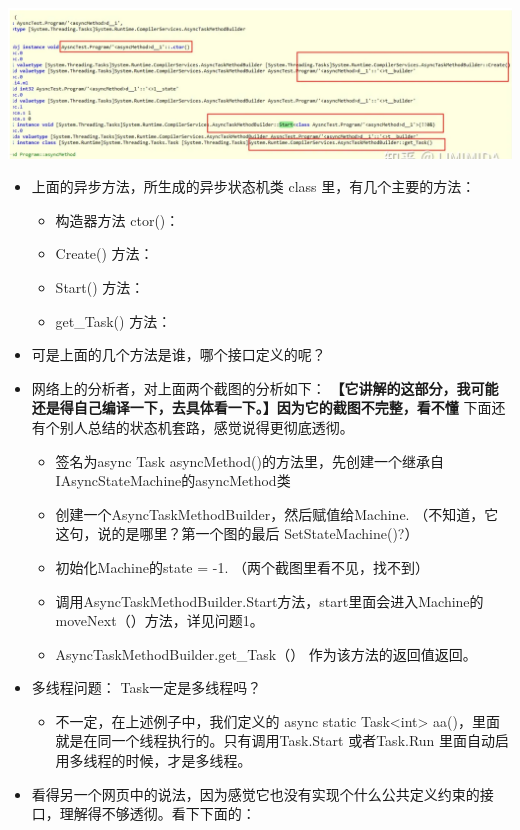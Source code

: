 \documentclass[9pt, b5paper]{article}
\begin{document}
\includegraphics[width=.9\linewidth]{./pic/et3_20230609_112757.png}
\begin{itemize}
\item 上面的异步方法，所生成的异步状态机类 class 里，有几个主要的方法：
\begin{itemize}
\item 构造器方法 ctor()：
\item Create() 方法：
\item Start() 方法：
\item get\_Task() 方法：
\end{itemize}
\item 可是上面的几个方法是谁，哪个接口定义的呢？
\item 网络上的分析者，对上面两个截图的分析如下： \textbf{【它讲解的这部分，我可能还是得自己编译一下，去具体看一下。】因为它的截图不完整，看不懂} 下面还有个别人总结的状态机套路，感觉说得更彻底透彻。
\begin{itemize}
\item 签名为async Task asyncMethod()的方法里，先创建一个继承自IAsyncStateMachine的asyncMethod类
\item 创建一个AsyncTaskMethodBuilder，然后赋值给Machine. （不知道，它这句，说的是哪里？第一个图的最后 SetStateMachine()?）
\item 初始化Machine的state = -1. （两个截图里看不见，找不到）
\item 调用AsyncTaskMethodBuilder.Start方法，start里面会进入Machine的moveNext（）方法，详见问题1。
\item AsyncTaskMethodBuilder.get\_Task（） 作为该方法的返回值返回。
\end{itemize}
\item 多线程问题： Task一定是多线程吗？
\begin{itemize}
\item 不一定，在上述例子中，我们定义的 async static Task<int> aa()，里面就是在同一个线程执行的。只有调用Task.Start 或者Task.Run 里面自动启用多线程的时候，才是多线程。
\end{itemize}
\item 看得另一个网页中的说法，因为感觉它也没有实现个什么公共定义约束的接口，理解得不够透彻。看下下面的：

\end{itemize}
\end{document}
